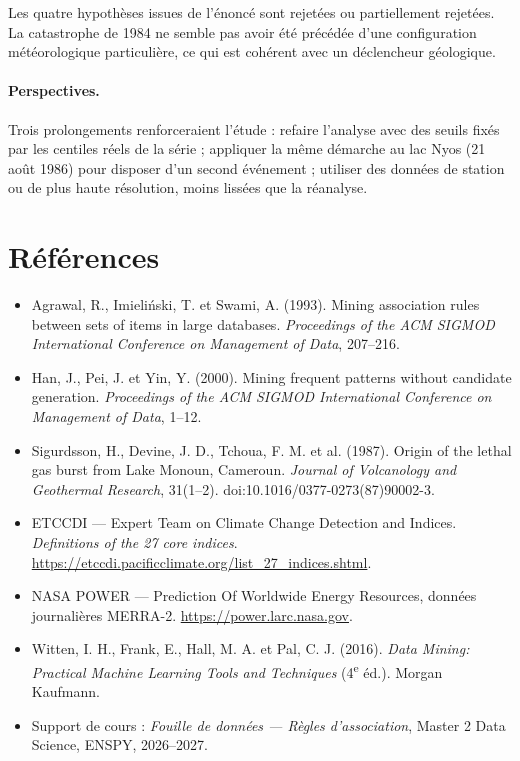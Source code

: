 \documentclass[12pt, a4paper]{article}
\begin{document}
Les quatre hypothèses issues de l'énoncé sont rejetées ou partiellement rejetées. La
catastrophe de 1984 ne semble pas avoir été précédée d'une configuration météorologique
particulière, ce qui est cohérent avec un déclencheur géologique.

\paragraph{Perspectives.} Trois prolongements renforceraient l'étude : refaire l'analyse avec
des seuils fixés par les centiles réels de la série ; appliquer la même démarche au lac Nyos
(21 août 1986) pour disposer d'un second événement ; utiliser des données de station ou de
plus haute résolution, moins lissées que la réanalyse.

\newpage
\section*{Références}

\begin{itemize}[label={},leftmargin=1em,itemsep=4pt]
\small
  \item Agrawal, R., Imieliński, T. et Swami, A. (1993). Mining association rules between sets
        of items in large databases. \emph{Proceedings of the ACM SIGMOD International
        Conference on Management of Data}, 207--216.
  \item Han, J., Pei, J. et Yin, Y. (2000). Mining frequent patterns without candidate
        generation. \emph{Proceedings of the ACM SIGMOD International Conference on Management
        of Data}, 1--12.
  \item Sigurdsson, H., Devine, J. D., Tchoua, F. M. et al. (1987). Origin of the lethal gas
        burst from Lake Monoun, Cameroun. \emph{Journal of Volcanology and Geothermal Research},
        31(1--2). doi:10.1016/0377-0273(87)90002-3.
  \item ETCCDI — Expert Team on Climate Change Detection and Indices. \emph{Definitions of the 27
        core indices}. \url{https://etccdi.pacificclimate.org/list_27_indices.shtml}.
  \item NASA POWER — Prediction Of Worldwide Energy Resources, données journalières MERRA-2.
        \url{https://power.larc.nasa.gov}.
  \item Witten, I. H., Frank, E., Hall, M. A. et Pal, C. J. (2016). \emph{Data Mining: Practical
        Machine Learning Tools and Techniques} (4\textsuperscript{e} éd.). Morgan Kaufmann.
  \item Support de cours : \emph{Fouille de données — Règles d'association}, Master 2 Data
        Science, ENSPY, 2026--2027.
\end{itemize}
\end{document}
